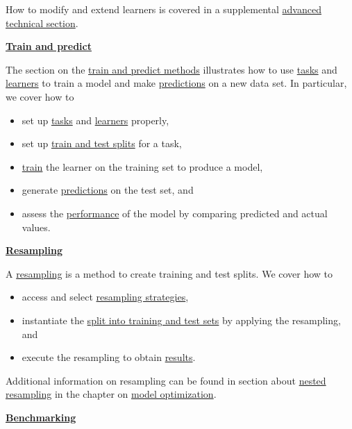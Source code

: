 \documentclass[
  11pt,
  parskip=half,
  DIV=calc,
  BCOR=10mm,
  x11names]{scrbook}
\providecommand{\tightlist}{%
  \setlength{\itemsep}{0pt}\setlength{\parskip}{0pt}}
\begin{document}
How to modify and extend learners is covered in a supplemental \protect\hyperlink{ext-learner}{advanced technical section}.

\protect\hyperlink{train-predict}{\textbf{Train and predict}}

The section on the \protect\hyperlink{train-predict}{train and predict methods} illustrates how to use \protect\hyperlink{tasks}{tasks} and \protect\hyperlink{learners}{learners} to train a model and make \protect\hyperlink{predicting}{predictions} on a new data set.
In particular, we cover how to

\begin{itemize}
\tightlist
\item
  set up \protect\hyperlink{train-predict-objects}{tasks} and \protect\hyperlink{train-predict-objects}{learners} properly,
\item
  set up \protect\hyperlink{split-data}{train and test splits} for a task,
\item
  \protect\hyperlink{training}{train} the learner on the training set to produce a model,
\item
  generate \protect\hyperlink{predicting}{predictions} on the test set, and
\item
  assess the \protect\hyperlink{measure}{performance} of the model by comparing predicted and actual values.
\end{itemize}

\protect\hyperlink{resampling}{\textbf{Resampling}}

A \protect\hyperlink{resampling}{resampling} is a method to create training and test splits.
We cover how to

\begin{itemize}
\tightlist
\item
  access and select \protect\hyperlink{resamp-settings}{resampling strategies},
\item
  instantiate the \protect\hyperlink{resamp-inst}{split into training and test sets} by applying the resampling, and
\item
  execute the resampling to obtain \protect\hyperlink{resamp-exec}{results}.
\end{itemize}

Additional information on resampling can be found in section about \protect\hyperlink{nested-resampling}{nested resampling} in the chapter on \protect\hyperlink{model-optim}{model optimization}.

\protect\hyperlink{benchmarking}{\textbf{Benchmarking}}
\end{document}
